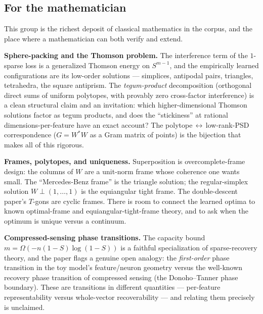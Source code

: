 \subsection*{For the mathematician}

This group is the richest deposit of classical mathematics in the corpus, and the place where a mathematician can both verify and extend.

\textbf{Sphere-packing and the Thomson problem.} The interference term of the $1$-sparse loss is a generalized Thomson energy on $S^{m-1}$, and the empirically learned configurations are its low-order solutions --- simplices, antipodal pairs, triangles, tetrahedra, the square antiprism. The \emph{tegum-product} decomposition (orthogonal direct sums of uniform polytopes, with provably zero cross-factor interference) is a clean structural claim and an invitation: which higher-dimensional Thomson solutions factor as tegum products, and does the ``stickiness'' at rational dimensions-per-feature have an exact account? The polytope$\,\leftrightarrow\,$low-rank-PSD correspondence ($G = W^{*}W$ as a Gram matrix of points) is the bijection that makes all of this rigorous.

\textbf{Frames, polytopes, and uniqueness.} Superposition is overcomplete-frame design: the columns of $W$ are a unit-norm frame whose coherence one wants small. The ``Mercedes-Benz frame'' is the triangle solution; the regular-simplex solution $W \perp (1,\dots,1)$ is the equiangular tight frame. The double-descent paper's $T$-gons are cyclic frames. There is room to connect the learned optima to known optimal-frame and equiangular-tight-frame theory, and to ask when the optimum is unique versus a continuum.

\textbf{Compressed-sensing phase transitions.} The capacity bound $m = \Omega(-n(1-S)\log(1-S))$ is a faithful specialization of sparse-recovery theory, and the paper flags a genuine open analogy: the \emph{first-order} phase transition in the toy model's feature/neuron geometry versus the well-known recovery phase transition of compressed sensing (the Donoho--Tanner phase boundary). These are transitions in different quantities --- per-feature representability versus whole-vector recoverability --- and relating them precisely is unclaimed.

